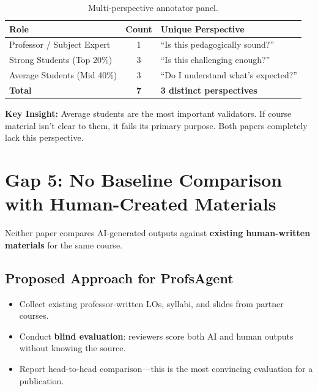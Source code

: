 \documentclass[11pt,a4paper]{article}
\begin{document}
\begin{table}[H]
\centering
\caption{Multi-perspective annotator panel.}
\begin{tabular}{@{}lcl@{}}
\toprule
\textbf{Role} & \textbf{Count} & \textbf{Unique Perspective} \\
\midrule
Professor / Subject Expert & 1 & ``Is this pedagogically sound?'' \\
Strong Students (Top 20\%) & 3 & ``Is this challenging enough?'' \\
Average Students (Mid 40\%) & 3 & ``Do I understand what's expected?'' \\
\midrule
\textbf{Total} & \textbf{7} & \textbf{3 distinct perspectives} \\
\bottomrule
\end{tabular}
\end{table}

\begin{warnbox}
\textbf{Key Insight:} Average students are the most important validators. If course material isn't clear to them, it fails its primary purpose. Both papers completely lack this perspective.
\end{warnbox}

\section{Gap 5: No Baseline Comparison with Human-Created Materials}

Neither paper compares AI-generated outputs against \textbf{existing human-written materials} for the same course.

\subsection{Proposed Approach for ProfsAgent}
\begin{itemize}[nosep]
    \item Collect existing professor-written LOs, syllabi, and slides from partner courses.
    \item Conduct \textbf{blind evaluation}: reviewers score both AI and human outputs without knowing the source.
    \item Report head-to-head comparison---this is the most convincing evaluation for a publication.
\end{itemize}
\end{document}
